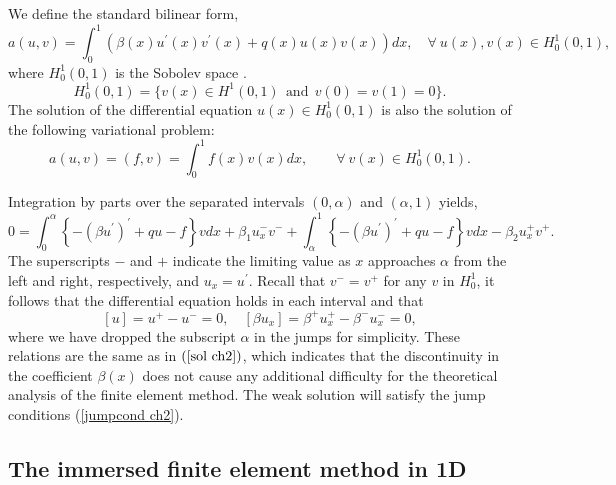 \documentclass[11pt]{article}
\numberwithin{equation}{section}
\begin{document}
We define the standard bilinear form,
\begin{equation*}
a\left(u,v\right)=\int_{0}^{1}
\left(\beta\left(x\right)u^{'}\left(x\right)v^{'}\left(x\right)+q\left(x\right)u\left(x\right)v\left(x\right)\right) dx,\quad\forall~ u\left(x\right), v\left(x\right) \in H^{1}_{0}\left(0,1\right),
\end{equation*}
where $H^{1}_{0}\left(0,1\right)$ is the Sobolev space
\cite{brenner2007mathematical, adams2003sobolev, tartar2007introduction}.
\begin{equation*}
 H^{1}_{0}\left(0,1\right)=\{v\left(x\right) \in H^{1} \left(0,1\right)~~\mbox{and}~~v(0)=v(1)=0 \}.
\end{equation*}
The solution of the differential equation $u\left(x\right)\in H^{1}_{0}\left(0,1\right)$
is also the solution of the following variational problem:
\begin{equation}\label{varform ch2}
a\left(u,v\right)=\left(f,v\right)
=\int_{0}^{1} f\left(x\right)v\left(x\right) dx, \qquad  \forall~ v\left(x\right) \in H^{1}_{0}\left(0,1\right).
\end{equation}


Integration by parts over the separated intervals $ \left(0,\alpha\right)$ and $\left(\alpha,1\right)$ yields,
\begin{equation*}\label{}
0=\int_{0}^{\alpha}\left\{-\left(\beta u^{'}\right)^{'}+qu-f\right\}vdx+\beta_{1}u^{-}_{x}v^{-}+\int_{\alpha}^{1}\left\{-\left(\beta u^{'}\right)^{'}+qu-f\right\}vdx-\beta_{2}u^{+}_{x}v^{+}.
\end{equation*}
The superscripts $-$ and $+$ indicate the limiting value as $x$ approaches $\alpha$ from the left and right, respectively, and $u_{x}=u^{'}$. Recall that $v^{-}=v^{+}$ for any $v$ in $H^{1}_{0}$, it follows that the differential equation holds in each interval and that
\begin{equation*}\label{}
\left[u\right]=u^{+}-u^{-}=0,\quad\left[\beta u_{x}\right]=\beta^{+}u^{+}_{x}-\beta^{-}u^{-}_{x}=0,
\end{equation*}
where we have dropped the subscript $\alpha$ in the jumps for simplicity.
These relations are the same as in $\left(\ref{sol ch2}\right)$,
which indicates that the discontinuity in the coefficient $\beta\left(x\right)$
does not cause any additional difficulty for the theoretical  analysis of the finite element method.
The weak solution will satisfy the jump conditions (\ref{jumpcond ch2}).



\subsection{The immersed finite element method  in 1D}
\end{document}
